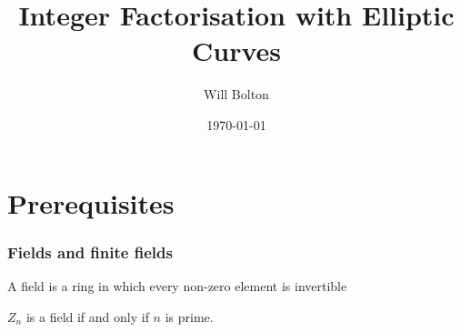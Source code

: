 \documentclass{beamer}
\title[Integer Factorisation with Elliptic Curves]{Integer Factorisation with Elliptic Curves}
\author{Will Bolton}
\date{\today}
\begin{document}
\titlepage
\section{Prerequisites}
\begin{frame}
\frametitle{Fields and finite fields}
\begin{definition}
	A field is a ring in which every non-zero element is invertible
\end{definition}
\begin{definition}
	$Z_n$ is a field if and only if $n$ is prime.
\end{definition}
\end{frame}
\end{document}

